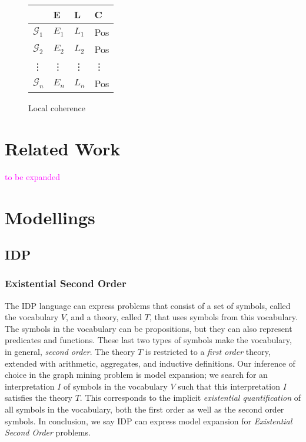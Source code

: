 \documentclass{article}
\theoremstyle{definition}
\newcommand{\graph}[1]{\ensuremath{\mathcal{#1}}}
\newcommand{\sergey}[1]{\textcolor{magenta}{\marginpar{\sc Sergey} #1}}
\begin{document}




\begin{figure}[h]
\centering
\begin{tabular}{l |l l l}
         & E & L      & C \\
\hline
$\graph{G}_{1}$  & $E_{1}$ & $L_{1}$ & Pos\\
$\graph{G}_{2}$  & $E_{2}$ & $L_{2}$ & Pos\\
  \vdots & \vdots  & \vdots  & \vdots\\
$\graph{G}_{n}$  & $E_{n}$ & $L_{n}$ & Pos\\
\end{tabular}
\caption{Local coherence\label{Fig:LocalCoherence}}
\end{figure}





\section{Related Work}
\sergey{to be expanded}
\section{Modellings}
\subsection{IDP}
\subsubsection{Existential Second Order}
The IDP language can express problems that consist of a set of symbols, called the vocabulary $V$, and a theory, called $T$, that uses symbols from this vocabulary.
The symbols in the vocabulary can be propositions, but they can also represent predicates and functions.
These last two types of symbols make the vocabulary, in general, \emph{second order}.
The theory $T$ is restricted to a \emph{first order} theory, extended with arithmetic, aggregates, and inductive definitions.
Our inference of choice in the graph mining problem is model expansion; we search for an interpretation $I$ of symbols in the vocabulary $V$ such that this interpretation $I$ satisfies the theory $T$.
This corresponds to the implicit \emph{existential quantification} of all symbols in the vocabulary, both the first order as well as the second order symbols.
In conclusion, we say IDP can express model expansion for \emph{Existential Second Order} problems. 
\end{document}
